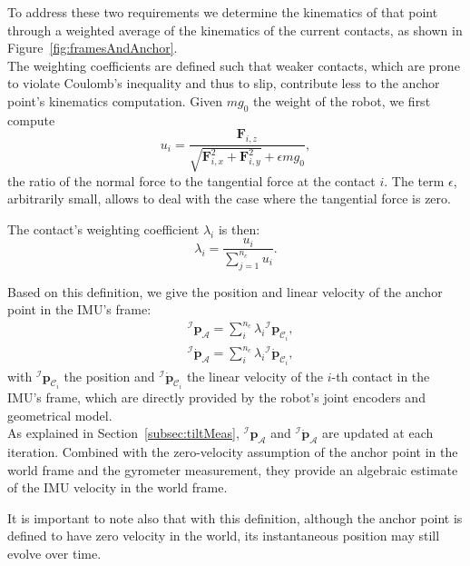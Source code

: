 \documentclass{IJCAS}
\begin{document}
To address these two requirements we determine the kinematics of that point through a weighted average of the kinematics of the current contacts, as shown in Figure~\ref{fig:framesAndAnchor}.  \\
The weighting coefficients are defined such that weaker contacts, which are prone to violate Coulomb's inequality and thus to slip, contribute less to the anchor point's kinematics computation. Given $mg_{0}$ the weight of the robot, we first compute 
\begin{equation}
    u_{i} = \frac{\boldsymbol{F}_{i,z}}{\sqrt{\boldsymbol{F}_{i,x}^2 + \boldsymbol{F}_{i,y}^2} + \epsilon mg_{0}}, \label{eq:ratio_ui}
\end{equation}
the ratio of the normal force to the tangential force at the contact $i$. The term $\epsilon$, arbitrarily small, allows to deal with the case where the tangential force is zero.

The contact's weighting coefficient $\lambda_{i}$ is then:
\begin{equation}
    \lambda_{i}=\frac{u_{i}}{\sum^{n_{c}}_{j=1}u_{i}}.
\end{equation}

Based on this definition, we give the position and linear velocity of the anchor point in the IMU's frame:
\begin{align} 
&{^{\mathcal{I}}}\boldsymbol{p}_{\mathcal{A}} = \sum^{n_{c}}_{i} \lambda_{i}  {^{\mathcal{I}}} \boldsymbol{p}_{{\mathcal{C}}_{i}}, \label{eq:imuAnchorPos} \\
&{^{\mathcal{I}}} \dot{\boldsymbol{p}}_{\mathcal{A}} = \sum^{n_{c}}_{i} \lambda_{i}  {^{\mathcal{I}}} \dot{\boldsymbol{p}}_{{\mathcal{C}}_{i}}, \label{eq:imuAnchorVel}
\end{align} 
with ${^{\mathcal{I}}} \boldsymbol{p}_{{\mathcal{C}}_{i}}$ the position and ${^{\mathcal{I}}} \dot{\boldsymbol{p}}_{{\mathcal{C}}_{i}}$ the linear velocity of the $i$-th contact in the IMU's frame, which are directly provided by the robot's joint encoders and geometrical model. \\As explained in Section~\ref{subsec:tiltMeas}, ${^{\mathcal{I}}}\boldsymbol{p}_{\mathcal{A}}$ and ${^{\mathcal{I}}} \dot{\boldsymbol{p}}_{\mathcal{A}}$ are updated at each iteration. Combined with the zero-velocity assumption of the anchor point in the world frame and the gyrometer measurement, they provide an algebraic estimate of the IMU velocity in the world frame.

It is important to note also that with this definition, although the anchor point is defined to have zero velocity in the world, its instantaneous position may still evolve over time.
\end{document}
